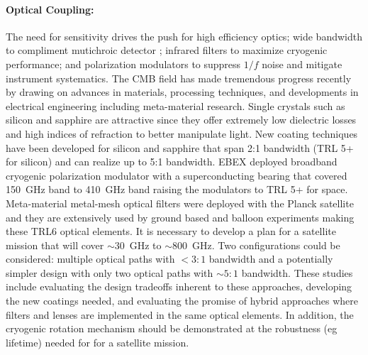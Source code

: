 
\paragraph{Optical Coupling:} 
The need for sensitivity drives the push for high efficiency optics; wide bandwidth to compliment mutichroic detector ; infrared filters to maximize cryogenic performance; and polarization modulators to suppress $1/f$ noise and mitigate instrument systematics.  The CMB field has made tremendous progress recently by drawing on advances in materials, processing techniques,  and developments in electrical engineering including meta-material research.  Single crystals such as silicon and sapphire are attractive since they offer extremely low dielectric losses and high indices of refraction to better manipulate light.  New coating techniques have been developed for silicon and sapphire that span 2:1 bandwidth (TRL 5+ for silicon) and can realize up to 5:1 bandwidth.  EBEX deployed broadband cryogenic polarization modulator with a superconducting bearing that covered 150~GHz band to 410~GHz band raising the modulators to TRL 5+ for space.  Meta-material metal-mesh optical filters were deployed with the Planck satellite and they are extensively used by ground based and balloon experiments making these TRL6 optical elements. It is necessary to develop a plan for a satellite mission that will cover $\sim30$~GHz to $\sim800$~GHz.  Two configurations could be considered: multiple optical paths with $<3:1$ bandwidth and a potentially simpler design with only two optical paths with  $\sim5:1$ bandwidth.   These studies include evaluating the design tradeoffs inherent to these approaches, developing the new coatings needed, and  evaluating the promise of hybrid approaches where filters and lenses are implemented in the same optical elements.  In addition, the cryogenic rotation mechanism should be demonstrated at the robustness (eg lifetime) needed for for a satellite mission.


